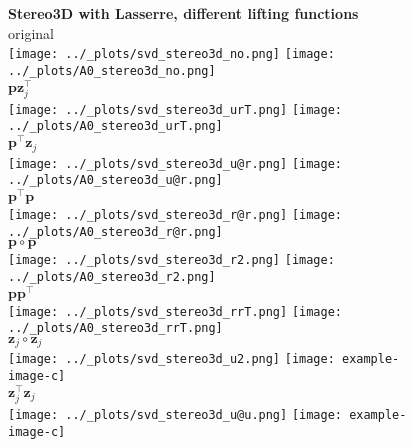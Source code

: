 \documentclass[11pt]{article}
\newcommand{\vc}[1]{\ensuremath{\bm{#1}}}
\begin{document}
\begin{figure}[h]
  \centering
  \textbf{\large{Stereo3D with Lasserre, different lifting functions}}\\
  original \\
  \texttt{[image: ../\_plots/svd\_stereo3d\_no.png]}
  \texttt{[image: ../\_plots/A0\_stereo3d\_no.png]} \\
  $\vc{p}\vc{z}_j^\top$ \\
  \texttt{[image: ../\_plots/svd\_stereo3d\_urT.png]}
  \texttt{[image: ../\_plots/A0\_stereo3d\_urT.png]} \\
  $\vc{p}^\top\vc{z}_j$ \\
  \texttt{[image: ../\_plots/svd\_stereo3d\_u@r.png]}
  \texttt{[image: ../\_plots/A0\_stereo3d\_u@r.png]} \\
  $\vc{p}^\top\vc{p}$ \\
  \texttt{[image: ../\_plots/svd\_stereo3d\_r@r.png]}
  \texttt{[image: ../\_plots/A0\_stereo3d\_r@r.png]} \\
  $\vc{p}\circ\vc{p}$ \\
  \texttt{[image: ../\_plots/svd\_stereo3d\_r2.png]}
  \texttt{[image: ../\_plots/A0\_stereo3d\_r2.png]}  \\
  $\vc{p}\vc{p}^\top$ \\
  \texttt{[image: ../\_plots/svd\_stereo3d\_rrT.png]}
  \texttt{[image: ../\_plots/A0\_stereo3d\_rrT.png]}  \\
  $\vc{z}_j\circ\vc{z}_j$ \\
  \texttt{[image: ../\_plots/svd\_stereo3d\_u2.png]} 
  \texttt{[image: example-image-c]}  \\
  $\vc{z}_j^\top\vc{z}_j$ \\
  \texttt{[image: ../\_plots/svd\_stereo3d\_u@u.png]}
  \texttt{[image: example-image-c]}  \\
\end{figure}
\end{document}
